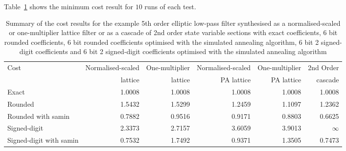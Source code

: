 \documentclass[a4paper,twoside,10pt,english]{report}
\begin{document}
Table~\ref{tab:samin-algorithm-cost-summary} shows the minimum cost result for
$10$ runs of each test. 
\begin{table}[!hb]
\centering
\begin{threeparttable}
\begin{tabular}{lrrrrr} \toprule
Cost&Normalised-scaled&One-multiplier&Normalised-scaled&One-multiplier&2nd Order\\
&lattice&lattice&PA lattice&PA lattice& cascade\\
\midrule
Exact                   & 1.0008 & 1.0008 & 1.0008 & 1.0008 & 1.0008 \\
Rounded                 & 1.5432 & 1.5299 & 1.2459 & 1.1097 & 1.2362 \\
Rounded with samin      & 0.7882 & 0.9516 & 0.9171 & 0.8803 & 0.6625 \\
Signed-digit            & 2.3373 & 2.7157 & 3.6059 & 3.9013 & $\infty$ \\
Signed-digit with samin & 0.7532 & 1.7492 & 0.9371 & 1.3505 & 0.7473 \\ 
\bottomrule
\end{tabular}
\end{threeparttable}
\caption[Summary of cost results for each simulated annealing algorithm example]
{Summary of the cost results for the example 5th order elliptic low-pass filter
synthesised as a normalised-scaled or one-multiplier lattice filter or as 
a cascade of 2nd order state variable sections with exact coefficients, 6 bit 
rounded coefficients, 6 bit rounded coefficients optimised with the simulated 
annealing algorithm, 6 bit 2 signed-digit coefficients and 6 bit 2 signed-digit
coefficients optimised with the simulated annealing algorithm}
\label{tab:samin-algorithm-cost-summary}
\end{table}
\end{document}
